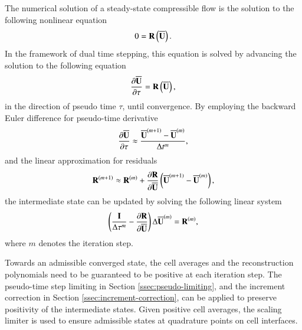 The numerical solution of a steady-state compressible flow is the solution to the following nonlinear equation
\begin{equation}
    0 = \mathbf{R} \left(\overline{\mathbf{U}}\right).
\end{equation}
In the framework of dual time stepping, this equation is solved by advancing the solution to the following equation
\begin{equation}
    \dfrac{\partial \overline{\mathbf{U}}}{\partial \tau} = \mathbf{R} \left(\overline{\mathbf{U}}\right),
\end{equation}
in the direction of pseudo time $\tau$, until convergence. By employing the backward Euler difference for pseudo-time derivative
\begin{equation}
    \dfrac{\partial \overline{\mathbf{U}}}{\partial \tau} \approx \dfrac{\overline{\mathbf{U}}^{(m+1)}-\overline{\mathbf{U}}^{(m)}}{\mathrm\Delta t^m},
\end{equation}
and the linear approximation for residuals
\begin{equation}
    \mathbf{R}^{(m+1)} \approx \mathbf{R}^{(m)} + \dfrac{\partial \mathbf{R}}{\partial \overline{\mathbf{U}}} \left(\overline{\mathbf{U}}^{(m+1)}-\overline{\mathbf{U}}^{(m)}\right),
\end{equation}
the intermediate state can be updated by solving the following linear system
\begin{equation}
    \left(\frac{\eye}{\inc \tau^m} -\partialderivative{\R }{\uu} \right) \inc \uu^{\left(m\right)}
    = \R^{\left(m\right)},
\end{equation}
where $m$ denotes the iteration step. 

Towards an admissible converged state, the cell averages and the reconstruction polynomials need to be guaranteed to be positive at each iteration step. The pseudo-time step limiting in Section \ref{ssec:pseudo-limiting}, and the increment correction in Section \ref{ssec:increment-correction}, can be applied to preserve positivity of the intermediate states. Given positive cell averages, the scaling limiter is used to ensure admissible states at quadrature points on cell interfaces. 




\endgroup